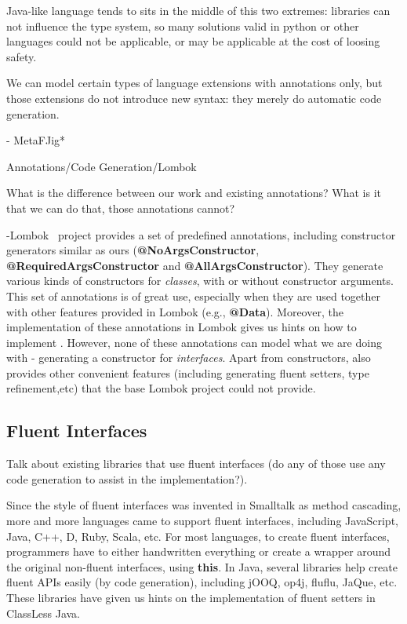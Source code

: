 Java-like language tends to sits in the middle of this two extremes:
libraries can not influence the type system, so many solutions valid in python or other languages could not be applicable, or may be applicable at the cost of loosing safety.

We can model certain types of language extensions with annotations 
only, but those extensions do not introduce new syntax: they 
merely do automatic code generation. 



- MetaFJig*~\cite{}

Annotations/Code Generation/Lombok

What is the difference between our work and existing annotations?
What is it that we can do that, those annotations cannot?

-Lombok~\cite{} project provides a set of predefined annotations, including
constructor generators similar as ours (\textbf{@NoArgsConstructor},
\textbf{@RequiredArgsConstructor} and \textbf{@AllArgsConstructor}). They
generate various kinds of constructors for \emph{classes}, with or without
constructor arguments. This set of annotations is of great use, especially when
they are used together with other features provided in Lombok (e.g.,
\textbf{@Data}). Moreover, the implementation of these annotations in Lombok
gives us hints on how to implement \mixin. However, none of these annotations
can model what we are doing with \mixin - generating a constructor for
\emph{interfaces}. Apart from constructors, \mixin also provides other
convenient features (including generating fluent setters, type refinement,etc)
that the base Lombok project could not provide.

\subsection{Fluent Interfaces}
Talk about existing libraries that use fluent interfaces (do any of
those use any code generation to assist in the implementation?).

Since the style of fluent interfaces was invented in Smalltalk as method
cascading, more and more languages came to support fluent interfaces, including
JavaScript, Java, C++, D, Ruby, Scala, etc. For most languages, to create fluent
interfaces, programmers have to either handwritten everything or create a
wrapper around the original non-fluent interfaces, using \textbf{this}. In Java,
several libraries help create fluent APIs easily (by code generation), including
jOOQ, op4j, fluflu, JaQue, etc. These libraries have given us hints on the
implementation of fluent setters in ClassLess Java.

